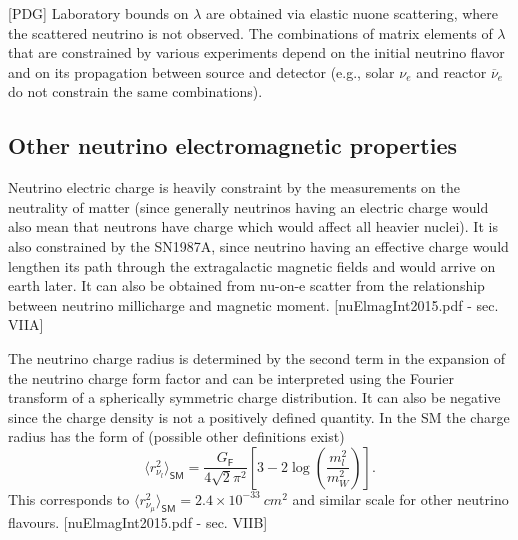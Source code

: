 [PDG] Laboratory bounds on $\lambda$ are obtained via elastic \gls{nuone} scattering, where the scattered neutrino is not observed. The combinations of matrix elements of $\lambda$ that are constrained by various experiments depend on the initial neutrino flavor and on its propagation between source and detector (e.g., solar $\nu_e$ and reactor $\overline{\nu}_e$ do not constrain the same combinations).

\subsection{Other neutrino electromagnetic properties}\label{sec:otherNuElmagProperties}


Neutrino electric charge is heavily constraint by the measurements on the neutrality of matter (since generally neutrinos having an electric charge would also mean that neutrons have charge which would affect all heavier nuclei). It is also constrained by the SN1987A, since neutrino having an effective charge would lengthen its path through the extragalactic magnetic fields and would arrive on earth later. It can also be obtained from nu-on-e scatter from the relationship between neutrino millicharge and magnetic moment. [nuElmagInt2015.pdf - sec. VIIA] 

The neutrino charge radius is determined by the second term in the expansion of the neutrino charge form factor and can be interpreted using the Fourier transform of a spherically symmetric charge distribution. It can also be negative since the charge density is not a positively defined quantity. In the SM the charge radius has the form of (possible other definitions exist)
\begin{equation}
\langle r_{\nu_l}^2\rangle_{\textsf{SM}}=\frac{G_{\textsf{F}}}{4\sqrt{2}\pi^2}\left[3-2\log\left(\frac{m_l^2}{m_W^2}\right)\right].
\end{equation}
This corresponds to $\langle r_{\nu_{\mu}}^2\rangle_{\textsf{SM}}=2.4\times 10^{-33}\ \unit{cm^2}$ and similar scale for other neutrino flavours. [nuElmagInt2015.pdf - sec. VIIB]


